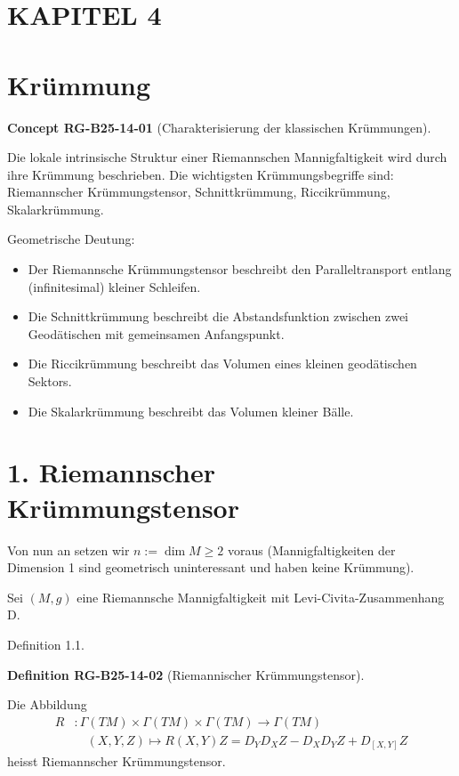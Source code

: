 \documentclass[10pt, letterpaper]{article}
\newcommand{\CustomHeading}[3]{%
  \par\medskip\noindent%
  \textbf{#1 #2} \textnormal{(#3)}.\enskip%
}
\newenvironment{DEF}[2]{\begin{unitbox}\CustomHeading{Definition}{#1}{#2}}{\end{unitbox}}
\newenvironment{CONC}[2]{\begin{unitbox}\CustomHeading{Concept}{#1}{#2}}{\end{unitbox}}
\begin{document}
\section*{KAPITEL 4}


\section*{Krümmung}



\begin{CONC}{RG-B25-14-01}{Charakterisierung der klassischen Krümmungen}
Die lokale intrinsische Struktur einer Riemannschen Mannigfaltigkeit wird durch ihre Krümmung beschrieben. Die wichtigsten Krümmungsbegriffe sind: Riemannscher Krümmungstensor, Schnittkrümmung, Riccikrümmung, Skalarkrümmung.

Geometrische Deutung:

\begin{itemize}
  \item Der Riemannsche Krümmungstensor beschreibt den Paralleltransport entlang (infinitesimal) kleiner Schleifen.
  \item Die Schnittkrümmung beschreibt die Abstandsfunktion zwischen zwei Geodätischen mit gemeinsamen Anfangspunkt.
  \item Die Riccikrümmung beschreibt das Volumen eines kleinen geodätischen Sektors.
  \item Die Skalarkrümmung beschreibt das Volumen kleiner Bälle.
\end{itemize}
\end{CONC}

\section*{1. Riemannscher Krümmungstensor}


Von nun an setzen wir $n:=\operatorname{dim} M \geq 2$ voraus (Mannigfaltigkeiten der Dimension 1 sind geometrisch uninteressant und haben keine Krümmung).


Sei $(M, g)$ eine Riemannsche Mannigfaltigkeit mit Levi-Civita-Zusammenhang D.

Definition 1.1. 

\begin{DEF}{RG-B25-14-02}{Riemannischer Krümmungstensor}
Die Abbildung
\[
\begin{aligned}
R &: \Gamma(TM) \times \Gamma(TM) \times \Gamma(TM) \longrightarrow \Gamma(TM) \\
   &\quad (X, Y, Z) \longmapsto R(X, Y)Z = D_Y D_X Z - D_X D_Y Z + D_{[X, Y]} Z
\end{aligned}
\]
heisst Riemannscher Krümmungstensor.
\end{DEF}
\end{document}

